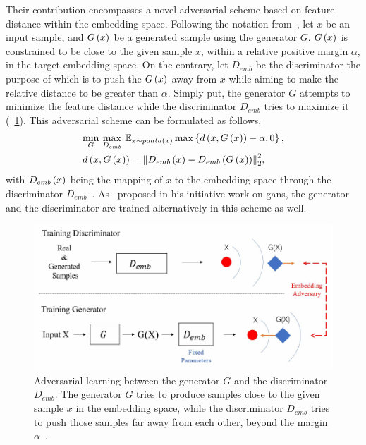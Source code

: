 Their contribution encompasses a novel adversarial scheme based on feature distance within the embedding space. Following the notation from~\cite{lou2019embreid}, let $x$ be an input sample, and ${G} \left( x \right)$ be a generated sample using the generator $G$. ${G} \left( x \right)$ is constrained to be close to the given sample $x$, within a relative positive margin $\alpha$, in the target embedding space. On the contrary, let $D_{emb}$ be the discriminator the purpose of which is to push the ${G} \left( x \right)$ away from $x$ while aiming to make the relative distance to be greater than $\alpha$. Simply put, the generator $G$ attempts to minimize the feature distance while the discriminator $D_{emb}$ tries to maximize it (\figstr{}~\ref{fig:EALNDiscriminatorGeneratorScheme}). This adversarial scheme can be formulated as follows,
\begin{equation}
    \begin{aligned}
         & \underset{G}{\min} \ \underset{D_{emb}}{\max} \ \mathbb{E}_{x \sim \func{pdata}{x}} \max \cbrackets{\func{d}{x, \func{G}{x}} - \alpha, 0}, \\
         & \func{d}{x, \func{G}{x}} = \euclnorm{\func{D_{emb}}{x} - \func{D_{emb}}{\func{G}{x}}}^2,
    \end{aligned}
\end{equation}
with ${D_{emb}} \left( x \right)$ being the mapping of $x$ to the embedding space through the discriminator $D_{emb}$~\cite{lou2019embreid}. As~\cite{goodfellow2014gans} proposed in his initiative work on \glspl{gan}, the generator and the discriminator are trained alternatively in this scheme as well.

\begin{figure}[t]
    \centerline{\includegraphics[width=0.8\linewidth]{figures/theoretical_foundations/ealn_discriminator_generator_scheme.pdf}}
    \caption[Embedding adversarial learning architecture]{Adversarial learning between the generator $G$ and the discriminator $D_{emb}$. The generator $G$ tries to produce samples close to the given sample $x$ in the embedding space, while the discriminator $D_{emb}$ tries to push those samples far away from each other, beyond the margin $\alpha$~\cite{lou2019embreid}.}
    \label{fig:EALNDiscriminatorGeneratorScheme}
\end{figure}

